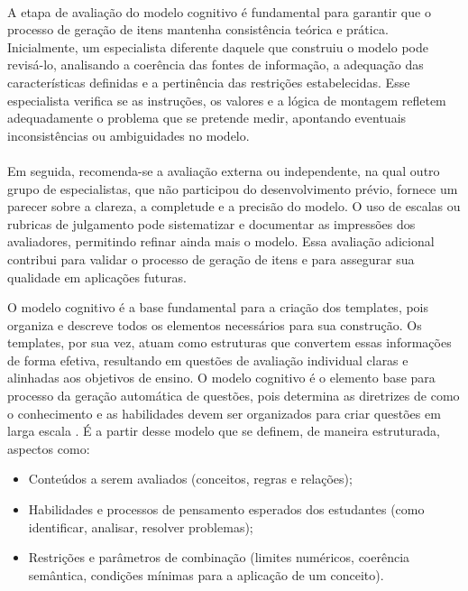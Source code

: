
\paragraph{}A etapa de avaliação do modelo cognitivo é fundamental para garantir que o processo de geração de itens mantenha consistência teórica e prática. Inicialmente, um especialista diferente daquele que construiu o modelo pode revisá-lo, analisando a coerência das fontes de informação, a adequação das características definidas e a pertinência das restrições estabelecidas. Esse especialista verifica se as instruções, os valores e a lógica de montagem refletem adequadamente o problema que se pretende medir, apontando eventuais inconsistências ou ambiguidades no modelo.

\paragraph{}Em seguida, recomenda-se a avaliação externa ou independente, na qual outro grupo de especialistas, que não participou do desenvolvimento prévio, fornece um parecer sobre a clareza, a completude e a precisão do modelo. O uso de escalas ou rubricas de julgamento pode sistematizar e documentar as impressões dos avaliadores, permitindo refinar ainda mais o modelo. Essa avaliação adicional contribui para validar o processo de geração de itens e para assegurar sua qualidade em aplicações futuras.




O modelo cognitivo é a base fundamental para a criação dos templates, pois organiza e descreve todos os elementos necessários para sua construção. Os templates, por sua vez, atuam como estruturas que convertem essas informações de forma efetiva, resultando em questões de avaliação individual claras e alinhadas aos objetivos de ensino.
O modelo cognitivo é o elemento base para processo da geração automática de questões, pois determina as diretrizes de como o conhecimento e as habilidades devem ser organizados para criar questões em larga escala \cite{gierl2016, gierl2017, gierlbulutzhang2018, keehner2017}. É a partir desse modelo que se definem, de maneira estruturada, aspectos como:

\begin{itemize} \item Conteúdos a serem avaliados (conceitos, regras e relações); \item Habilidades e processos de pensamento esperados dos estudantes (como identificar, analisar, resolver problemas); \item Restrições e parâmetros de combinação (limites numéricos, coerência semântica, condições mínimas para a aplicação de um conceito). \end{itemize}



